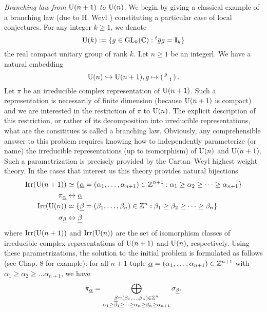 \emph{Branching law from $\mathrm{U}(n+1)$ to $\mathrm{U}(n)$}.
We begin by giving a classical example of a branching law (due to H. Weyl \cite{weyl1946classical}) constituting a particular case of local conjectures.
For any integer $k\geq 1$, we denote
\[
    \mathrm{U}(k) := \{g \in \mathrm{GL}_k(\mathbb{C}) : {}^t \bar{g} g = \mathbf{I}_k \}
\]
the real compact unitary group of rank $k$.
Let $n \geq 1$ be an integerl.
We have a natural embedding
\[
    \mathrm{U}(n) \hookrightarrow \mathrm{U}(n+1), g \mapsto \left(\begin{smallmatrix}  g & \\ & 1 \end{smallmatrix}\right).
\]
Let $\pi$ be an irreducible complex representation of $\mathrm{U}(n+1)$. Such a representation is necessarily of finite dimension (because $\mathrm{U}(n+1)$ is compact) and we are interested in the restriction of $\pi$ to $\mathrm{U}(n)$.
The explicit description of this restriction, or rather of its decomposition into irreducible representations, what are the consititues is called a branching law.
Obviously, any comprehensible answer to this problem requires knowing how to independently parameterize (or name) the irreducible representations (up to isomorphism) of $\mathrm{U}(n)$ and $\mathrm{U}(n+1)$.
Such a parametrization is precisely provided by the Cartan--Weyl highest weight theory.
In the cases that interest us this theory provides natural bijections
\begin{align*}
    \mathrm{Irr}(\mathrm{U}(n+1)) &\simeq \{ \underline{\alpha} = (\alpha_1, \dots, \alpha_{n+1}) \in \mathbb{Z}^{n+1}: \alpha_1 \geq \alpha_2 \geq \dots \geq \alpha_{n+1} \} \\
    \pi_{\underline{\alpha}} &\leftrightarrow \underline{\alpha} \\
    \mathrm{Irr}(\mathrm{U}(n)) & \simeq \{ \underline{\beta} = (\beta_1, \dots, \beta_n) \in \mathbb{Z}^{n}: \beta_1 \geq \beta_2 \geq \dots \geq \beta_n \} \\
    \sigma_{\underline{\beta}} &\leftrightarrow \underline{\beta}
\end{align*}
where $\mathrm{Irr}(\mathrm{U}(n+1))$ and $\mathrm{Irr}(\mathrm{U}(n))$ are the set of isomorphism classes of irreducible complex representations of $\mathrm{U}(n+1)$ and $\mathrm{U}(n)$, respectively.
Using these parametrizations, the solution to the initial problem is formulated as follows (see \cite{goodman2009symmetry} Chap. 8 for
example):
for all $n+1$-tuple $\underline{\alpha} = (\alpha_1, \dots, \alpha_{n+1}) \in \mathbb{Z}^{n+1}$ with $\alpha_1 \geq \alpha_2 \geq \dots \alpha_{n+1}$, we have
\[
    \pi_{\underline{\alpha}} = \bigoplus_{\substack{\underline{\beta}  = (\beta_1, \dots, \beta_n)\in \mathbb{Z}^{n} \\ \alpha_1 \geq \beta_1 \geq \dots \geq \alpha_n \geq \beta_n \geq \alpha_{n+1}}} \sigma_{\underline{\beta}}.
\]
